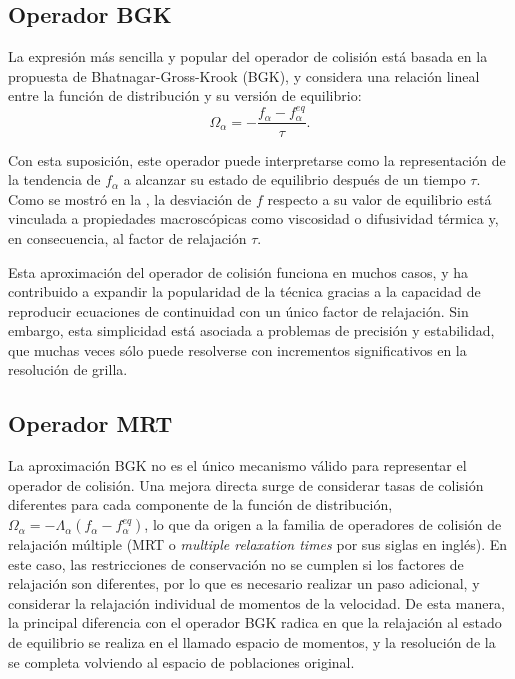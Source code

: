 \subsection{Operador BGK}

La expresi\'on m\'as sencilla y popular del operador de colisi\'on est\'a basada en la propuesta de Bhatnagar-Gross-Krook (BGK), y considera una relaci\'on lineal entre la funci\'on de distribuci\'on y su versi\'on de equilibrio:
\begin{equation}
	\Omega_{\alpha} = -\dfrac{f_{\alpha} - f_{\alpha}^{eq}}{\tau}.
\end{equation}

Con esta suposici\'on, este operador puede interpretarse como la representaci\'on de la tendencia de $f_{\alpha}$ a alcanzar su estado de equilibrio despu\'es de un tiempo $\tau$. Como se mostr\'o en la , la desviaci\'on de $f$ respecto a su valor de equilibrio est\'a vinculada a propiedades macrosc\'opicas como viscosidad o difusividad t\'ermica y, en consecuencia, al factor de relajaci\'on $\tau$.

Esta aproximaci\'on del operador de colisi\'on funciona en muchos casos, y ha contribuido a expandir la popularidad de la t\'ecnica gracias a la capacidad de reproducir ecuaciones de continuidad con un \'unico factor de relajaci\'on. Sin embargo, esta simplicidad  est\'a asociada a problemas de precisi\'on y estabilidad, que muchas veces s\'olo puede resolverse con incrementos significativos en la resoluci\'on de grilla.


\subsection{Operador MRT}

La aproximaci\'on BGK no es el \'unico mecanismo v\'alido para representar el operador de colisi\'on. Una mejora directa surge de considerar tasas de colisi\'on diferentes para cada componente de la funci\'on de distribuci\'on, $\Omega_{\alpha} = -\Lambda_{\alpha}(f_{\alpha} - f_{\alpha}^{eq})$, lo que da origen a la familia de operadores de colisi\'on de relajaci\'on m\'ultiple \cite{lallemand_theory_2000} (MRT o \emph{multiple relaxation times} por sus siglas en ingl\'es). En este caso, las restricciones de conservaci\'on no se cumplen si los factores de relajaci\'on son diferentes, por lo que es necesario realizar un paso adicional, y considerar la relajaci\'on individual de momentos de la velocidad. De esta manera, la principal diferencia con el operador BGK radica en que la relajaci\'on al estado de equilibrio se realiza en el llamado espacio de momentos, y la resoluci\'on de la \lbe{} se completa volviendo al espacio de poblaciones original.

